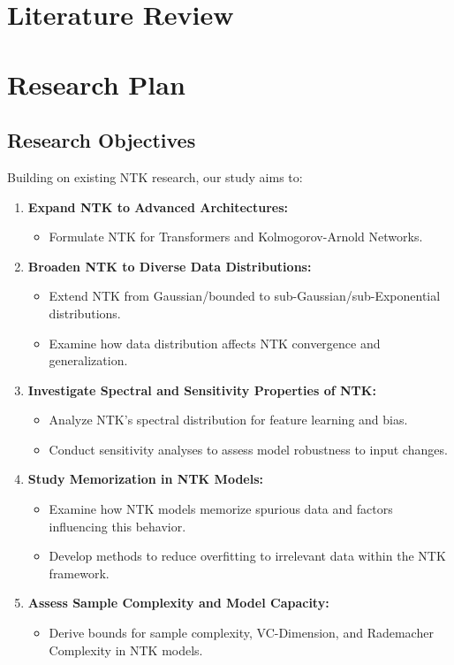 \documentclass[12pt]{article}
\begin{document}
\section{Literature Review}
\newpage
\section{Research Plan}
\subsection{Research Objectives}
Building on existing NTK research, our study aims to:

\begin{enumerate}[label=\arabic*.]
    \item \textbf{Expand NTK to Advanced Architectures:}
    \begin{itemize}
        \item Formulate NTK for Transformers and Kolmogorov-Arnold Networks.
    \end{itemize}
    
    \item \textbf{Broaden NTK to Diverse Data Distributions:}
    \begin{itemize}
        \item Extend NTK from Gaussian/bounded to sub-Gaussian/sub-Exponential distributions.
        \item Examine how data distribution affects NTK convergence and generalization.
    \end{itemize}
    
    \item \textbf{Investigate Spectral and Sensitivity Properties of NTK:}
    \begin{itemize}
        \item Analyze NTK's spectral distribution for feature learning and bias.
        \item Conduct sensitivity analyses to assess model robustness to input changes.
    \end{itemize}
    
    \item \textbf{Study Memorization in NTK Models:}
    \begin{itemize}
        \item Examine how NTK models memorize spurious data and factors influencing this behavior.
        \item Develop methods to reduce overfitting to irrelevant data within the NTK framework.
    \end{itemize}
    
    \item \textbf{Assess Sample Complexity and Model Capacity:}
    \begin{itemize}
        \item Derive bounds for sample complexity, VC-Dimension, and Rademacher Complexity in NTK models.
    \end{itemize}
\end{enumerate}
\end{document}
